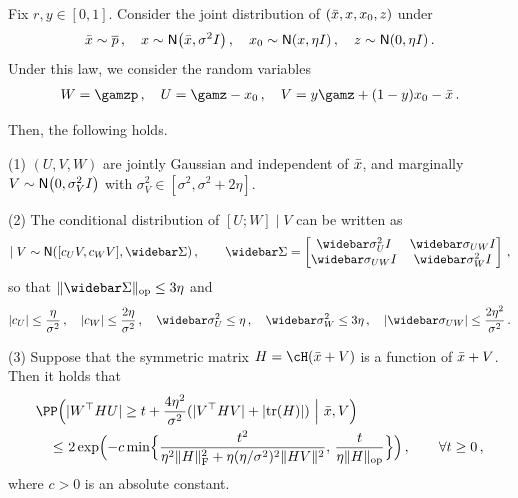 \begin{lemma}\label{lem:path-joint-Gaussian}
Fix $r,y\in[0,1]$.
Consider the joint distribution of $(\bar{x},x,x_0,z)$ under
\begin{align*}
    \xbar\sim \pbar\,, \quad
    x\sim \normal{\xbar,\sigma^2\Id}\,, \quad
    \xz\sim \normal{x,\eta\Id}\,, \quad
    z\sim \Neta\,.
\end{align*}
Under this law, we consider the random variables
\begin{align*}
    W=\gamzp\,, \quad
    U=\gamz-\xz\,, \quad
    V=y\gamz+(1-y)\xz-\xbar\,.
\end{align*}

Then, the following holds.

(1) $(U,V,W)$ are jointly Gaussian and independent of $\bar{x}$, and marginally $V\sim \normal{0,\sigma_V^2\Id}$ with $\sigma_V^2\in [\sigma^2,\sigma^2+2\eta]$. 

(2) The conditional distribution of $[U;W]\mid V$ can be written as 
\begin{align*}
    [U;W]\mid V\sim \normal{[c_UV,c_WV], \Sigbar}\,, \qquad
    \Sigbar=\begin{bmatrix}
        \sigu^2\Id & \siguw \Id \\
        \siguw\Id & \sigw^2\Id 
    \end{bmatrix}\,,
\end{align*}
so that $\nrmop{\Sigbar}\leq 3\eta$ and
\begin{align*}
    \abs{c_U}\leq \frac{\eta}{\sigma^2}\,,\quad \abs{c_W}\leq \frac{2\eta}{\sigma^2}\,, \quad 
    \sigu^2\leq \eta\,,\quad \sigw^2\leq 3\eta\,, \quad
    \abs{\siguw}\leq \frac{2\eta^2}{\sigma^2}\,.
\end{align*}

(3) Suppose that the symmetric matrix $H=\cH(\xbar+V)$ is a function of $\bar{x}+V$. Then it holds that
\begin{align*}
    \MoveEqLeft\PP\prn[\Big]{\Big. \abs{W\tp H U}\geq t+\frac{4\eta^2}{\sigma^2}(\abs{V\tp HV}+\abs{\tr(H)}) ~\Big|~ \xbar, V} \\
    \leq&~ 2\exp\prn[\Big]{-c\min\crl[\Big]{\frac{t^2}{\eta^2\nrmF{H}^2+\eta (\eta/\sigma^2)^2\nrm{HV}^2},\, \frac{t}{\eta\nrmop{H}}}}\,, \qquad \forall t\geq 0\,,
\end{align*}
where $c>0$ is an absolute constant.
\end{lemma}

